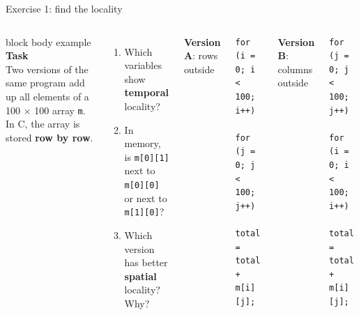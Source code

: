 \documentclass[aspectratio=169,10pt]{beamer}
\newcommand{\taskhead}[2]{%
  \begin{beamercolorbox}[rounded=true,sep=0.12cm,wd=\linewidth]{block body example}
    \small\textbf{#1}\\[0.04cm]
    \footnotesize #2
  \end{beamercolorbox}\vspace{0.1cm}}
\begin{document}
\begin{frame}[fragile]{Exercise 1: find the locality}
  \begin{columns}[T,onlytextwidth]
      \taskhead{Task}{Two versions of the same program add up all elements of a 100 $\times$ 100 array
        \texttt{m}. In C, the array is stored \textbf{row by row}.}
      \footnotesize
      \begin{enumerate}\setlength{\itemsep}{3pt}
        \item Which variables show \textbf{temporal} locality?
        \item In memory, is \texttt{m[0][1]} next to \texttt{m[0][0]} or next to \texttt{m[1][0]}?
        \item Which version has better \textbf{spatial} locality? Why?
      \end{enumerate}
      {\scriptsize\textbf{Version A}: rows outside\par}
\begin{lstlisting}[style=cc]
for (i = 0; i < 100; i++)
    for (j = 0; j < 100; j++)
        total = total + m[i][j];
\end{lstlisting}
      {\scriptsize\textbf{Version B}: columns outside\par}
\begin{lstlisting}[style=cc]
for (j = 0; j < 100; j++)
    for (i = 0; i < 100; i++)
        total = total + m[i][j];
\end{lstlisting}
  \end{columns}
  \vfill
  \begin{center}
    \arraystrip{}
  \end{center}
\end{frame}
\end{document}
